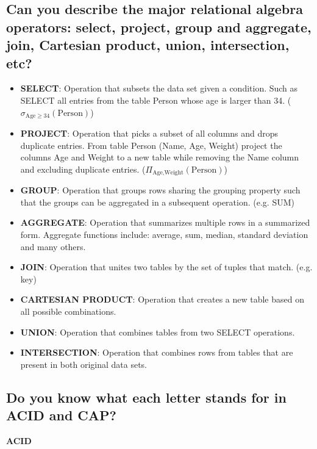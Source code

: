 \documentclass{article}
\begin{document}
\subsection{Can you describe the major relational algebra operators: select, project, group and aggregate, join, Cartesian product, union, intersection, etc?}

\begin{itemize}
    \item \textbf{SELECT}: Operation that subsets the data set given a condition. Such as SELECT all entries from the table Person whose age is larger than 34. ($\sigma_{\text{Age}\geq34}(\text{Person})$)
    \item \textbf{PROJECT}: Operation that picks a subset of all columns and drops duplicate entries. From table Person (Name, Age, Weight) project the columns Age and Weight to a new table while removing the Name column and excluding duplicate entries. ($ {\displaystyle \Pi _{\text{Age,Weight}}({\text{Person}})}$)
    \item \textbf{GROUP}: Operation that groups rows sharing the grouping property such that the groups can be aggregated in a subsequent operation. (e.g. SUM)
    \item \textbf{AGGREGATE}: Operation that summarizes multiple rows in a summarized form. Aggregate functions include: average, sum, median, standard deviation and many others.
    \item \textbf{JOIN}: Operation that unites two tables by the set of tuples that match. (e.g. key) \item \textbf{CARTESIAN PRODUCT}: Operation that creates a new table based on all possible combinations.
    \item \textbf{UNION}: Operation that combines tables from two SELECT operations.
    \item \textbf{INTERSECTION}: Operation that combines rows from tables that are present in both original data sets.
\end{itemize}

\subsection{Do you know what each letter stands for in ACID and CAP?}

\textbf{ACID}
\end{document}
